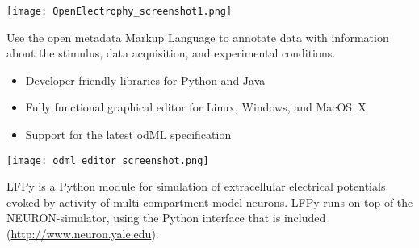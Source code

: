 \begin{multicols}{3}
\texttt{[image: OpenElectrophy\_screenshot1.png]}



%


Use the {open metadata Markup Language} to annotate data with information about the stimulus, data acquisition, and experimental conditions.

\begin{itemize}[nolistsep,topsep=0em,leftmargin=1pc]
\item Developer friendly libraries for Python and Java
\item Fully functional graphical editor for Linux, Windows, and MacOS~X
\item Support for the latest odML specification
\end{itemize}

\texttt{[image: odml\_editor\_screenshot.png]}





\vspace{0.5em}                  %
LFPy is a Python module for simulation of extracellular electrical
potentials evoked by activity of multi-compartment model neurons.
LFPy runs on top of the NEURON-simulator, using the Python interface
that is included (\url{http://www.neuron.yale.edu}).


\end{multicols}
